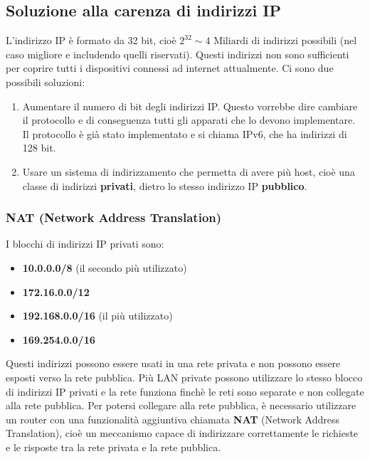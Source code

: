 \documentclass[a4paper]{article}
\begin{document}
\subsection{Soluzione alla carenza di indirizzi IP}
L'indirizzo IP è formato da 32 bit, cioè \( 2^{32} \sim 4 \text{ Miliardi} \) di indirizzi
possibili (nel caso migliore e includendo quelli riservati). Questi indirizzi non sono
sufficienti per coprire tutti i dispositivi connessi ad internet attualmente.
Ci sono due possibili soluzioni:
\begin{enumerate}
  \item Aumentare il numero di bit degli indirizzi IP. Questo vorrebbe dire cambiare
    il protocollo e di conseguenza tutti gli apparati che lo devono implementare.
    Il protocollo è già stato implementato e si chiama IPv6, che ha
    indirizzi di 128 bit.

  \item Usare un sistema di indirizzamento che permetta di avere più host, cioè una classe
    di indirizzi \textbf{privati}, dietro lo stesso indirizzo IP \textbf{pubblico}.
\end{enumerate}

\subsubsection{NAT (Network Address Translation)}
I blocchi di indirizzi IP privati sono:
\begin{itemize}
  \item \textbf{10.0.0.0/8} (il secondo più utilizzato)
  \item \textbf{172.16.0.0/12}
  \item \textbf{192.168.0.0/16} (il più utilizzato)
  \item \textbf{169.254.0.0/16}
\end{itemize}
Questi indirizzi possono essere usati in una rete privata e non possono essere esposti
verso la rete pubblica.
\label{27-11-D3}
\noindent
Più LAN private possono utilizzare lo stesso blocco di indirizzi IP privati e la rete
funziona finchè le reti sono separate e non collegate alla rete pubblica. Per potersi
collegare alla rete pubblica, è necessario utilizzare un router con una funzionalità
aggiuntiva chiamata \textbf{NAT} (Network Address Translation), cioè un meccanismo
capace di indirizzare correttamente le richieste e le risposte tra la rete privata e
la rete pubblica.
\end{document}
